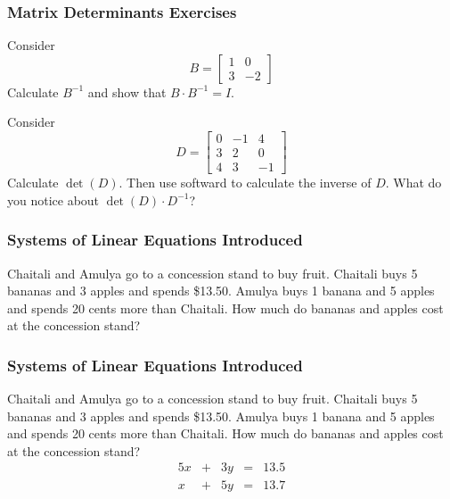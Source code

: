 \documentclass[xcolor=dvipsnames]{beamer}
\begin{document}
\begin{frame}
  \frametitle{Matrix Determinants Exercises}  
  {\ubung} Consider
  \begin{equation}
    \label{eq:aengixoh}
    B=\left[
      \begin{array}{cc}
        1 & 0 \\
        3 & -2 
      \end{array}\right]
  \end{equation}
  Calculate $B^{-1}$ and show that $B\cdot{}B^{-1}=I$.

  \medskip

  {\ubung} Consider
  \begin{equation}
    \label{eq:eecheipo}
    D=\left[
      \begin{array}{ccc}
        0 & -1 & 4 \\
        3 & 2 & 0 \\
        4 & 3 & -1 
      \end{array}\right]
  \end{equation}
Calculate $\det(D)$. Then use softward to calculate the inverse of
$D$. What do you notice about $\det(D)\cdot{}D^{-1}$?
\end{frame}

\begin{frame}
  \frametitle{Systems of Linear Equations Introduced}
  Chaitali and Amulya go to a concession stand to buy fruit. Chaitali
  buys 5 bananas and 3 apples and spends \$13.50. Amulya buys 1 banana
  and 5 apples and spends 20 cents more than Chaitali. How much do
  bananas and apples cost at the concession stand?
\end{frame}

\begin{frame}
  \frametitle{Systems of Linear Equations Introduced}
  Chaitali and Amulya go to a concession stand to buy fruit. Chaitali
  buys 5 bananas and 3 apples and spends \$13.50. Amulya buys 1 banana
  and 5 apples and spends 20 cents more than Chaitali. How much do
  bananas and apples cost at the concession stand?
  \begin{equation}
    \label{eq:mohloogh}
    \begin{array}{rcrcl}
      5x&+&3y&=&13.5 \\
      x&+&5y&=&13.7
    \end{array}
  \end{equation}
\end{frame}
\end{document}
